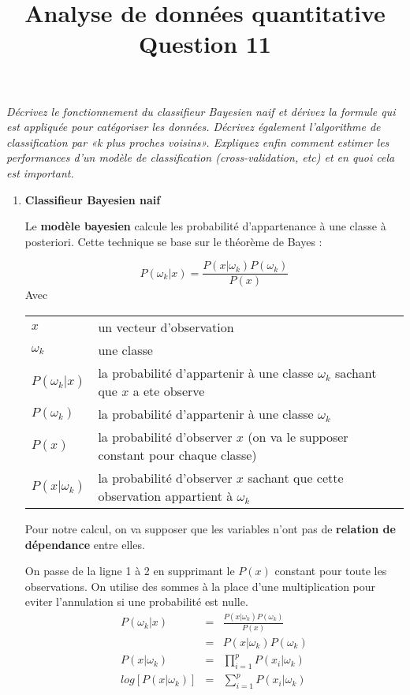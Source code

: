 \documentclass[a4paper, 11pt, onecolumn]{article}
\title{Analyse de données quantitative\\Question 11}
\date{}
\begin{document}
\maketitle


\textit{Décrivez le fonctionnement du classifieur Bayesien naif et dérivez la formule qui est appliquée pour catégoriser les données. Décrivez également l’algorithme de classification par «k plus proches voisins». Expliquez enfin comment estimer les performances d’un modèle de classification (cross-validation, etc) et en quoi cela est important.}

\begin{enumerate}
\item \textbf{Classifieur Bayesien naif}

  Le \textbf{modèle bayesien} calcule les probabilité d'appartenance à une classe à posteriori. Cette technique se base sur le théorème de Bayes :
\begin{framed}
$$P(\omega_k|x)=\frac{P(x|\omega_k)P(\omega_k)}{P(x)}$$
Avec 

\begin{tabular}{ll}
$x$ & un vecteur d'observation\\
$\omega_k$ & une classe\\
$P(\omega_k|x)$ & la probabilité d'appartenir à une classe $\omega_k$ sachant que $x$ a ete observe\\
$P(\omega_k)$ & la probabilité d'appartenir à une classe $\omega_k$\\
$P(x)$ & la probabilité d'observer $x$ (on va le supposer constant pour chaque classe)\\
$P(x|\omega_k)$ & la probabilité d'observer $x$ sachant que cette observation appartient à $\omega_k$
\end{tabular}
\end{framed}

\danger Pour notre calcul, on va supposer que les variables n'ont pas de \textbf{relation de dépendance} entre elles.

\begin{framed}
On passe de la ligne 1 à 2 en supprimant le $P(x)$ constant pour toute les observations. On utilise des sommes à la place d'une multiplication pour eviter l'annulation si une probabilité est nulle.
\begin{eqnarray}
P(\omega_k|x)&=&\frac{P(x|\omega_k)P(\omega_k)}{P(x)}\\
&=&P(x|\omega_k)P(\omega_k)\\
P(x|\omega_k)&=& \prod_{i=1}^p P(x_i|\omega_k)\\
log[P(x|\omega_k)]&=& \sum_{i=1}^p P(x_i|\omega_k)
\end{eqnarray}
\end{framed}


\end{enumerate}
\end{document}
